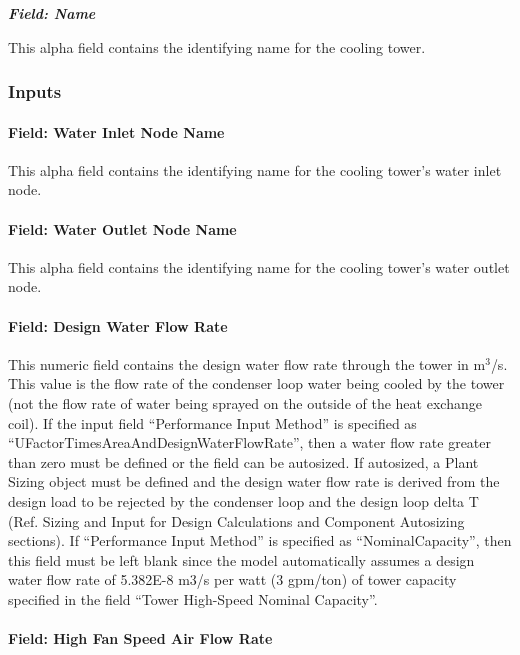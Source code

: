 \textbf{\emph{Field: Name}}

This alpha field contains the identifying name for the cooling tower.

\subsubsection{Inputs}\label{inputs-1-006}

\paragraph{Field: Water Inlet Node Name}\label{field-water-inlet-node-name-1}

This alpha field contains the identifying name for the cooling tower's water inlet node.

\paragraph{Field: Water Outlet Node Name}\label{field-water-outlet-node-name-1}

This alpha field contains the identifying name for the cooling tower's water outlet node.

\paragraph{Field: Design Water Flow Rate}\label{field-design-water-flow-rate-1}

This numeric field contains the design water flow rate through the tower in m\(^{3}\)/s. This value is the flow rate of the condenser loop water being cooled by the tower (not the flow rate of water being sprayed on the outside of the heat exchange coil). If the input field ``Performance Input Method'' is specified as ``UFactorTimesAreaAndDesignWaterFlowRate'', then a water flow rate greater than zero must be defined or the field can be autosized. If autosized, a Plant Sizing object must be defined and the design water flow rate is derived from the design load to be rejected by the condenser loop and the design loop delta T (Ref. Sizing and Input for Design Calculations and Component Autosizing sections). If ``Performance Input Method'' is specified as ``NominalCapacity'', then this field must be left blank since the model automatically assumes a design water flow rate of 5.382E-8 m3/s per watt (3 gpm/ton) of tower capacity specified in the field ``Tower High-Speed Nominal Capacity''.

\paragraph{Field: High Fan Speed Air Flow Rate}\label{field-high-fan-speed-air-flow-rate}

